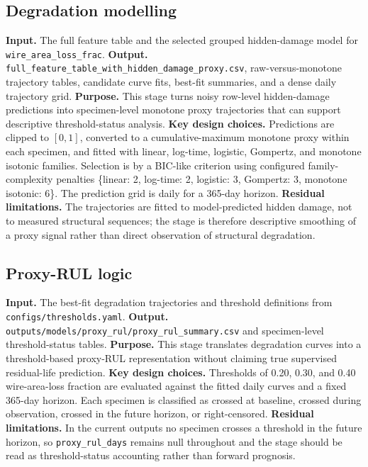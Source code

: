 \documentclass[10pt,a4paper,twocolumn]{article}
\begin{document}
\subsection{Degradation modelling}

\textbf{Input.} The full feature table and the selected grouped hidden-damage model for \texttt{wire\_area\_loss\_frac}. \textbf{Output.} \texttt{full\_feature\_table\_with\_hidden\_damage\_proxy.csv}, raw-versus-monotone trajectory tables, candidate curve fits, best-fit summaries, and a dense daily trajectory grid. \textbf{Purpose.} This stage turns noisy row-level hidden-damage predictions into specimen-level monotone proxy trajectories that can support descriptive threshold-status analysis. \textbf{Key design choices.} Predictions are clipped to $[0,1]$, converted to a cumulative-maximum monotone proxy within each specimen, and fitted with linear, log-time, logistic, Gompertz, and monotone isotonic families. Selection is by a BIC-like criterion using configured family-complexity penalties \{linear: 2, log-time: 2, logistic: 3, Gompertz: 3, monotone isotonic: 6\}. The prediction grid is daily for a 365-day horizon. \textbf{Residual limitations.} The trajectories are fitted to model-predicted hidden damage, not to measured structural sequences; the stage is therefore descriptive smoothing of a proxy signal rather than direct observation of structural degradation.

\subsection{Proxy-RUL logic}

\textbf{Input.} The best-fit degradation trajectories and threshold definitions from \texttt{configs/thresholds.yaml}. \textbf{Output.} \texttt{outputs/models/proxy\_rul/proxy\_rul\_summary.csv} and specimen-level threshold-status tables. \textbf{Purpose.} This stage translates degradation curves into a threshold-based proxy-RUL representation without claiming true supervised residual-life prediction. \textbf{Key design choices.} Thresholds of 0.20, 0.30, and 0.40 wire-area-loss fraction are evaluated against the fitted daily curves and a fixed 365-day horizon. Each specimen is classified as crossed at baseline, crossed during observation, crossed in the future horizon, or right-censored. \textbf{Residual limitations.} In the current outputs no specimen crosses a threshold in the future horizon, so \texttt{proxy\_rul\_days} remains null throughout and the stage should be read as threshold-status accounting rather than forward prognosis.
\end{document}
